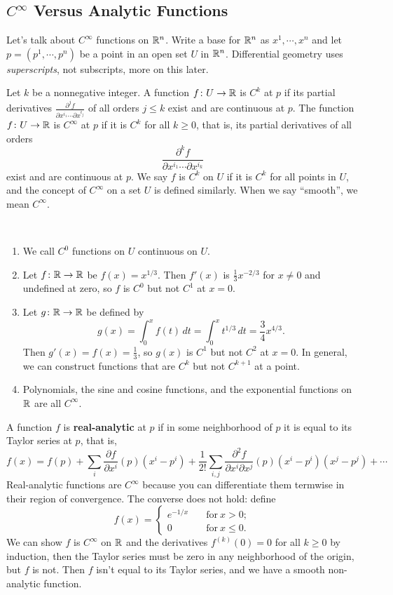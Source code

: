 \subsection{$C^{\infty}$ Versus Analytic Functions}
Let's talk about $C^{\infty}$ functions on $\mathbb{R}^n $. Write a base for $\mathbb{R}^n $ as $x^1,\cdots ,x^n $ and let $p=(p^1,\cdots ,p^n )$ be a point in an open set $U$ in $\mathbb{R}^n $. Differential geometry uses \emph{superscripts}, not subscripts, more on this later.
\begin{definition}[]
    Let $k$ be a nonnegative integer. A function $f \colon U \to \mathbb{R}$ is $C^k$ at $p$ if its partial derivatives $\frac{\partial ^j f}{\partial x^{i_1} \cdots \partial x^{i_j }}$ of all orders $j\leq k$ exist and are continuous at $p$. The function $f \colon U \to \mathbb{R}$ is $C^{\infty}$ at $p$ if it is $C^k$ for all $k\geq 0$, that is, its partial derivatives of all orders \[
        \frac{\partial ^kf}{\partial x^{i_1}\cdots \partial x^{i_k}}
    \] exist and are continuous at $p$. We say $f$ is $C^k$ on $U$ if it is  $C^k$ for all points in $U$, and the concept of $C^{\infty}$ on a set $U$ is defined similarly. When we say ``smooth'', we mean $C^{\infty}$.
\end{definition}
\begin{example}
    \,
    \begin{enumerate}[label=(\roman*)]
        \item We call $C^0$ functions on $U$ continuous on $U$.
        \item Let $f \colon \mathbb{R} \to \mathbb{R}$ be $f(x)=x^{1/3}$. Then $f'(x)$ is $\frac{1}{3}x^{-2/3}$ for $x\neq 0$ and undefined at zero, so $f$ is $C^0$ but not $C^1$ at $x=0$.
        \item Let $g\colon \mathbb{R} \to \mathbb{R}$ be defined by  \[
                g(x)=\int_{0}^{x} f(t) \, dt= \int_{0}^{x} t ^{1/3} \, dt= \frac{3}{4}x^{4/3}.
            \] Then $g'(x)=f(x)=\frac{1}{3}$, so $g(x)$ is $C^1$ but not $C^2$ at $x=0$. In general, we can construct functions that are $C^k$ but not $C^{k+1}$ at a point.
        \item Polynomials, the sine and cosine functions, and the exponential functions on $\mathbb{R}$ are all $C^{\infty}$.
    \end{enumerate}
\end{example}
A function $f$ is \textbf{real-analytic} at $p$ if in some neighborhood of $p$ it is equal to its Taylor series at $p$, that is, \[
    f(x)=f(p)+\sum_{i}^{} \frac{\partial f}{\partial x^i }(p)(x^i -p^i )+\frac{1}{2!}\sum_{i,j}^{} \frac{\partial ^2f}{\partial x^i \partial x^j}(p) (x^i -p^i )(x^j-p^j)+\cdots 
\] Real-analytic functions are $C^{\infty}$ because you can differentiate them termwise in their region of convergence. The converse does not hold: define \[
f(x)=
\begin{cases}
    e^{-1/x} \quad & \text{for} \ x>0;\\
    0 & \text{for} \ x\leq 0.
\end{cases}
\] We can show $f$ is $C^{\infty}$ on $\mathbb{R}$ and the derivatives $f^{(k)}(0)=0$ for all $k\geq 0$ by induction, then the Taylor series must be zero in any neighborhood of the origin, but $f$ is not. Then $f$ isn't equal to its Taylor series, and we have a smooth non-analytic function.
